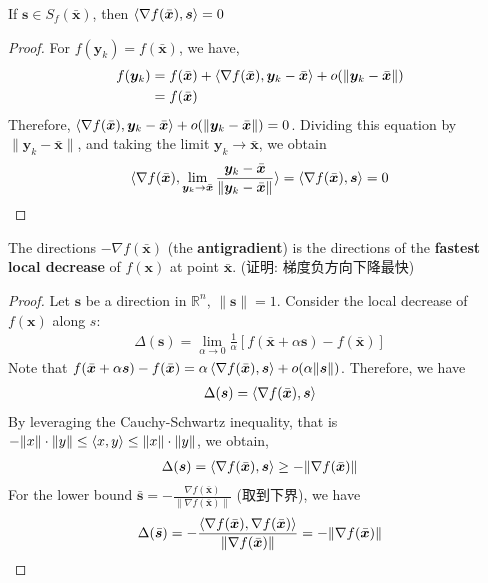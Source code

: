 \begin{lemma}
    If $\bm s\in S_f(\bar{\bm x})$, then $\braket{\nabla f(\bar{\bm x}),\bm s}=0$
\end{lemma}
\begin{proof}
    For $f(\bm y_k)=f(\bar{\bm x})$, we have,
    \begin{align*}
        f(\bm y_k)&=f(\bar{\bm x})+\braket{\nabla f(\bar{\bm x}), \bm y_k-\bar{\bm x}}+o(\| \bm y_k-\bar{\bm x} \|)\\
        &=f(\bar{\bm x})
    \end{align*}
    Therefore, $\braket{\nabla f(\bar{\bm x}), \bm y_k-\bar{\bm x}}+o(\| \bm y_k-\bar{\bm x} \|)=0$. Dividing this equation by $\| \bm y_k-\bar{\bm x} \|$, and taking the limit $ \bm y_k\to\bar{\bm x} $, we obtain
    \begin{align*}
        \braket{\nabla f(\bar{\bm x}),\lim_{\bm y_k\to \bar{\bm x}} \frac{\bm y_k-\bar{\bm x}}{\|\bm y_k-\bar{\bm x}\|}}=\braket{\nabla f(\bar{\bm x}), \bm s}=0
    \end{align*}
\end{proof}

The directions $-\nabla f(\bar{\bm x})$ (the \textbf{antigradient}) is the directions of the \textbf{fastest local decrease} of $f(\bm x)$ at point $\bar{\bm x}$. (证明: 梯度负方向下降最快)

\begin{proof}
    Let $\bm s$ be a direction in $\mathbb{R}^n$, $\|\bm s\|=1$. Consider the local decrease of $f(\bm x)$ along $s$:
    \begin{align*}
        \Delta(\bm s)=\lim_{\alpha\to 0}\frac{1}{\alpha}[f(\bar{\bm x}+\alpha\bm s)-f(\bar{\bm x})]
    \end{align*}
    Note that $f(\bar{\bm x}+\alpha\bm s)-f(\bar{\bm x})=\alpha\braket{\nabla f(\bar{\bm x}),\bm s}+o(\alpha\|\bm s\|)$. Therefore, we have
    \begin{align*}
        \Delta(\bm s)=\braket{\nabla f(\bar{\bm x}),\bm s}
    \end{align*}
    By leveraging the Cauchy-Schwartz inequality, that is $-\|x\|\cdot\|y\|\le \braket{x,y}\le \|x\|\cdot\|y\|$, we obtain,
    \begin{align*}
        \Delta (\bm s)=\braket{\nabla f(\bar{\bm x}),\bm s}\ge -\| \nabla f(\bar{\bm x}) \|
    \end{align*}
    For the lower bound $\bar{\bm s}=-\frac{\nabla f(\bar{\bm x})}{\|\nabla f(\bar{\bm x})\|}$ (取到下界), we have
    \begin{align*}
        \Delta(\bar{\bm s})=- \frac{\braket{\nabla f(\bar{\bm x}),\nabla f(\bar{\bm x})}}{\|\nabla f(\bar{\bm x})\|}=-\|\nabla f(\bar{\bm x})\|
    \end{align*}
\end{proof}

